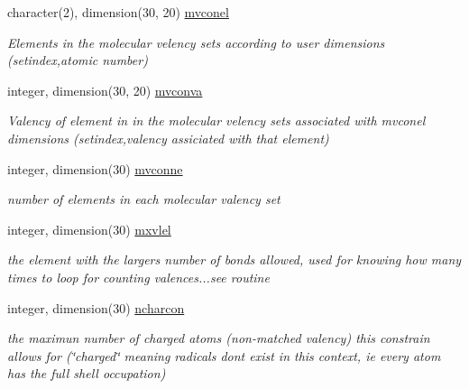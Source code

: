 \begin{DoxyCompactItemize}
\mbox{\label{namespaceglobaldata_a624e0c0852d1b72a8a3f0652b1e46135}} 
character(2), dimension(30, 20) \mbox{\hyperlink{namespaceglobaldata_a624e0c0852d1b72a8a3f0652b1e46135}{mvconel}}
\begin{DoxyCompactList}\small\item\em Elements in the molecular velency sets according to user dimensions (setindex,atomic number) \end{DoxyCompactList}\item 
\mbox{\label{namespaceglobaldata_a56a4f96d9cecf3280f5be24338267fb5}} 
integer, dimension(30, 20) \mbox{\hyperlink{namespaceglobaldata_a56a4f96d9cecf3280f5be24338267fb5}{mvconva}}
\begin{DoxyCompactList}\small\item\em Valency of element in in the molecular velency sets associated with mvconel dimensions (setindex,valency assiciated with that element) \end{DoxyCompactList}\item 
\mbox{\label{namespaceglobaldata_aed5b00b62da5bb2266e6dc804d4e714b}} 
integer, dimension(30) \mbox{\hyperlink{namespaceglobaldata_aed5b00b62da5bb2266e6dc804d4e714b}{mvconne}}
\begin{DoxyCompactList}\small\item\em number of elements in each molecular valency set \end{DoxyCompactList}\item 
\mbox{\label{namespaceglobaldata_a5cd699ee0342b3e9deb57712153fba5d}} 
integer, dimension(30) \mbox{\hyperlink{namespaceglobaldata_a5cd699ee0342b3e9deb57712153fba5d}{mxvlel}}
\begin{DoxyCompactList}\small\item\em the element with the largers number of bonds allowed, used for knowing how many times to loop for counting valences...see routine \end{DoxyCompactList}\item 
\mbox{\label{namespaceglobaldata_a33c0783d3556b70908b843175062db21}} 
integer, dimension(30) \mbox{\hyperlink{namespaceglobaldata_a33c0783d3556b70908b843175062db21}{ncharcon}}
\begin{DoxyCompactList}\small\item\em the maximun number of charged atoms (non-\/matched valency) this constrain allows for (\char`\"{}charged\char`\"{} meaning radicals dont exist in this context, ie every atom has the full shell occupation) \end{DoxyCompactList}\item 

\end{DoxyCompactItemize}
